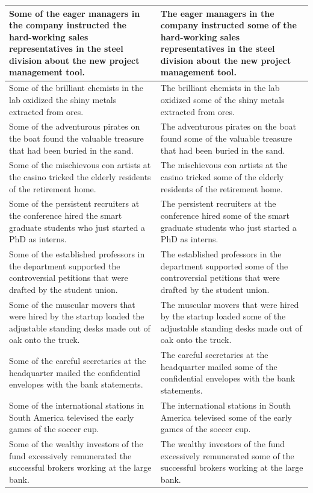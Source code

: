 \documentclass[11pt,a4paper]{article}
\begin{document}
\begin{table}[h]
    \centering
    \begin{tabular}{|p{}|p{}|}
     \hline
        Some of the eager managers in the company instructed the hard-working sales representatives in the steel division about the new project management tool. & The eager managers in the company instructed some of the hard-working sales representatives in the steel division about the new project management tool. \\
     \hline
     
        Some of the brilliant chemists in the lab oxidized the shiny metals extracted from ores. & The brilliant chemists in the lab oxidized some of the shiny metals extracted from ores. \\
        \hline
        Some of the adventurous pirates on the boat found the valuable treasure that had been buried in the sand. & The adventurous pirates on the boat found some of the valuable treasure that had been buried in the sand. \\
        \hline
         Some of the mischievous con artists at the casino tricked the elderly residents of the retirement home. & The mischievous con artists at the casino tricked some of the elderly residents of the retirement home. \\
        \hline
        Some of the persistent recruiters at the conference hired the smart graduate students who just started a PhD as interns. & The persistent recruiters at the conference hired some of the smart graduate students who just started a PhD as interns.  \\
        \hline
        Some of the established professors in the department supported the controversial petitions that were drafted by the student union. & The established professors in the department supported some of the controversial petitions that were drafted by the student union.
        \\
        \hline
        Some of the muscular movers that were hired by the startup loaded the adjustable standing desks made out of oak onto the truck. & The muscular movers that were hired by the startup loaded some of the adjustable standing desks made out of oak onto the truck. \\
        \hline
        Some of the careful secretaries at the headquarter mailed the confidential envelopes with the bank statements. & The careful secretaries at the headquarter mailed some of the confidential envelopes with the bank statements. \\
        \hline
        Some of the international stations in South America televised the early games of the soccer cup. & The international stations in South America televised some of the early games of the soccer cup. \\
        \hline
        Some of the wealthy investors of the fund excessively remunerated the successful brokers working at the large bank. & The wealthy investors of the fund excessively remunerated some of the successful brokers working at the large bank. \\
        \hline
        

\end{tabular}
\end{table}
\end{document}
